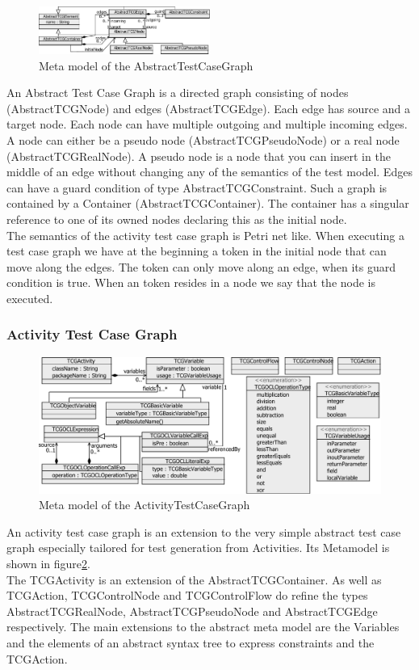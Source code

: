 \begin{figure}
\label{fig:AbstractTCGMetaModel}
\includegraphics[width=0.5\textwidth]{./pics/AbstractTestCaseGraph.pdf}
\caption{Meta model of the AbstractTestCaseGraph}
\end{figure}
An Abstract Test Case Graph is a directed graph consisting of nodes (AbstractTCGNode) and edges (AbstractTCGEdge). Each edge has source and a target node. Each node can have multiple outgoing and multiple incoming edges.
A node can either be a pseudo node (AbstractTCGPseudoNode) or a real node (AbstractTCGRealNode). A pseudo node is a node that you can insert in the middle of an edge without changing any of the semantics of the test model. Edges can have a guard condition of type AbstractTCGConstraint. Such a graph is contained by a Container (AbstractTCGContainer). The container has a singular reference to one of its owned nodes declaring this as the initial node. \\
The semantics of the activity test case graph is Petri net like. When executing a test case graph we have at the beginning a token in the initial node that can move along the edges. The token can only move along an edge, when its guard condition is true. When an token resides in a node we say that the node is executed.

\subsubsection{Activity Test Case Graph}
\begin{figure}
\label{fig:ActivityTCGMetaModel}
\includegraphics[width=\textwidth]{./pics/ActivityTestCaseGraph.pdf}
\caption{Meta model of the ActivityTestCaseGraph}
\end{figure}
An activity test case graph is an extension to the very simple abstract test case graph especially tailored for test generation from Activities. Its Metamodel is shown in figure\ref{fig:ActivityTCGMetaModel}.\\
The TCGActivity is an extension of the AbstractTCGContainer. As well as TCGAction, TCGControlNode and TCGControlFlow do refine the types AbstractTCGRealNode, AbstractTCGPseudoNode and AbstractTCGEdge respectively. 
The main extensions to the abstract meta model are the Variables and the elements of an abstract syntax tree to express constraints and the TCGAction.
